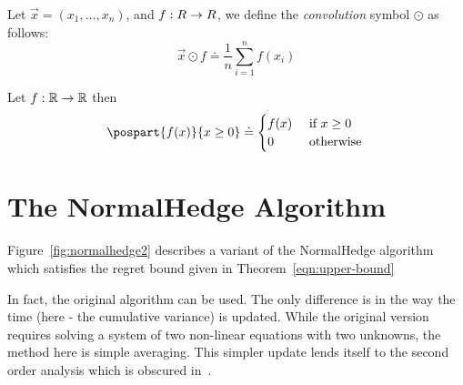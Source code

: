 \documentclass[anon,12pt]{colt2024} %
\begin{document}
Let $\vec{x}=(x_1,\ldots,x_n)$, and $f:R \to R$, we define the {\em convolution} symbol $\odot$ as follows:
$$\vec{x} \odot f \doteq \frac{1}{n}\sum_{i=1}^{n} f(x_i)$$

Let $f : \mathbb{R} \to \mathbb{R}$ then
\[\pospart{f(x)}{x\geq 0} \doteq
  \begin{cases}
    f(x) & \mbox{ if } x \geq 0\\
    0    & \mbox{ otherwise }
  \end{cases}
\]


\newcommand{\finalpot}{\pot^{\mbox{\tiny final}}}

\section{The NormalHedge  Algorithm} \label{sec:NormalHedgeAlg}
Figure~\ref{fig:normalhedge2} describes a variant of the NormalHedge
algorithm~\cite{chaudhuri2009parameter} which satisfies the regret
bound given in Theorem~\ref{eqn:upper-bound}

In fact, the original algorithm can be used. The only difference is in
the way the time (here - the cumulative variance) is updated. While
the original version requires solving a system of two non-linear
equations with two unknowns, the method here is simple averaging.
This simpler update lends itself to the second order analysis which is
obscured in~\cite{chaudhuri2009parameter}.
\end{document}
